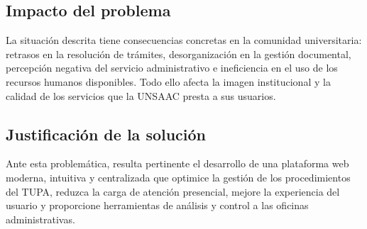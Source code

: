 \subsection{Impacto del problema}

La situación descrita tiene consecuencias concretas en la comunidad universitaria:
retrasos en la resolución de trámites, desorganización en la gestión documental,
percepción negativa del servicio administrativo e ineficiencia en el uso de los
recursos humanos disponibles. Todo ello afecta la imagen institucional y la calidad
de los servicios que la UNSAAC presta a sus usuarios.

\subsection{Justificación de la solución}

Ante esta problemática, resulta pertinente el desarrollo de una plataforma web moderna,
intuitiva y centralizada que optimice la gestión de los procedimientos del TUPA, reduzca
la carga de atención presencial, mejore la experiencia del usuario y proporcione
herramientas de análisis y control a las oficinas administrativas.
